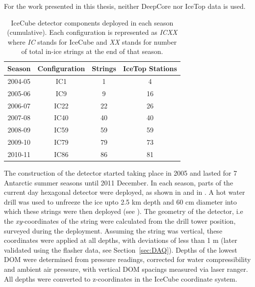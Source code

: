 For the work presented in this thesis, neither DeepCore nor IceTop data is used.
\begin{table}
    \caption[Deployment of IceCube strings in seasonal order]{IceCube detector components deployed in each season (cumulative). Each configuration is represented as \emph{ICXX} where \emph{IC} stands for IceCube and \emph{XX} stands for number of total in-ice strings at the end of that season.}
    \begin{tabular}{cccc}
        \hline
        \hline
        Season & Configuration & Strings & IceTop Stations\\
        \hline
        2004-05 & IC1 & 1 & 4\\ 
        2005-06 & IC9 & 9 & 16\\ 
        2006-07 & IC22 & 22 & 26\\ 
        2007-08 & IC40 & 40 & 40\\ 
        2008-09 & IC59 & 59 & 59\\ 
        2009-10 & IC79 & 79 & 73\\ 
        2010-11 & IC86 & 86 & 81\\  
        \hline
        \hline
    \end{tabular}
    \end{table}


The construction of the detector started taking place in 2005 and lasted for 7 Antarctic summer seasons until 2011 December. In each season, parts of the current day hexagonal detector were deployed, as shown in  and in . A hot water drill was used to unfreeze the ice upto 2.5 km depth and 60 cm diameter into which these strings were then deployed (see ). The geometry of the detector, i.e the \emph{xy}-coordinates of the string were calculated from the drill tower position, surveyed during the deployment. Assuming the string was vertical, these coordinates were applied at all depths, with deviations of less than 1 m (later validated using the flasher data, see Section~\ref{sec:DAQ}). Depths of the lowest DOM were determined from pressure readings, corrected for water compressibility and ambient air pressure, with vertical DOM spacings measured via laser ranger. All depths were converted to z-coordinates in the IceCube coordinate system.\par  


